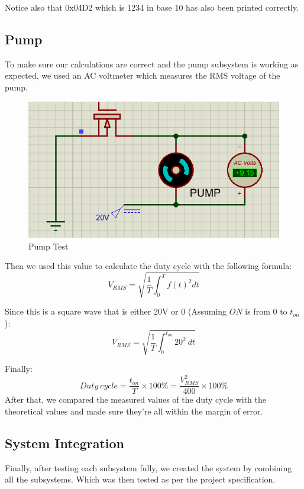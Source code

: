 \documentclass[a4paper, 12pt]{article}
\begin{document}
Notice also that 0x04D2 which is 1234 in base 10 has also been printed correctly.


\subsection{Pump}

To make sure our calculations are correct and the pump subsystem is working as expected, we used an AC voltmeter which measures the RMS voltage of the pump. \\

\begin{figure}[H]
\centering
\includegraphics[width=0.45\linewidth]{images/Pump_Test}
\caption{Pump Test}
\end{figure}

Then we used this value to calculate the duty cycle with the following formula:
\begin{equation*}
	V_{RMS} = \sqrt{\frac{1}{T} \int_{0}^T f(t)^2 dt}
\end{equation*}

Since this is a square wave that is either 20V or 0 (Assuming $ON$ is from 0 to $t_{on}$):
\begin{equation*}
	V_{RMS} = \sqrt{\frac{1}{T} \int_{0}^{t_{on}} 20^2 \: dt}
\end{equation*}


Finally:
\begin{equation*}
	Duty \: cycle  = \frac{t_{on}}{T} \times 100\% = \frac{V_{RMS} ^ 2}{400} \times 100\%
\end{equation*}
After that, we compared the measured values of the duty cycle with the theoretical values and made sure they’re all within the margin of error. \\

\newpage


\subsection{System Integration}
Finally, after testing each subsystem fully, we created the system by combining all the subsystems. Which was then tested as per the project specification.
\end{document}
